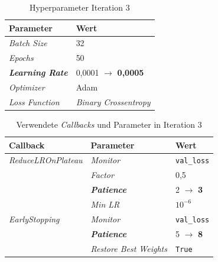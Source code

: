 \documentclass[
    a4paper,        %
    11pt,           %
    ngerman,        %
    parskip=half,   %
    listof=totoc,   %
    bibliography=totoc %
]{scrartcl}
\begin{document}
\begin{table}[H]
    \centering
    \caption{Hyperparameter Iteration 3}
    \label{tab:hyperparams_iter3}
    \begin{tabular}{ll}
        \toprule
        \textbf{Parameter} & \textbf{Wert} \\
        \midrule
        \textit{Batch Size} & 32 \\
        \textit{Epochs} & 50 \\
        \textbf{\textit{Learning Rate}} & 0,0001 $\rightarrow$ \textbf{0,0005} \\
        \textit{Optimizer} & Adam \\
        \textit{Loss Function} & \textit{Binary Crossentropy} \\
        \bottomrule
    \end{tabular}
\end{table}

\begin{table}[H]
    \centering
    \caption{Verwendete \textit{Callbacks} und Parameter in Iteration 3}
    \label{tab:callbacks_iter3}
    \begin{tabular}{lll}
        \toprule
        \textbf{Callback} & \textbf{Parameter} & \textbf{Wert} \\
        \midrule
        \textit{ReduceLROnPlateau} & \textit{Monitor} & \texttt{val\_loss} \\
                          & \textit{Factor} & 0,5 \\
                          & \textbf{\textit{Patience}} & 2 $\rightarrow$ \textbf{3} \\
                          & \textit{Min LR} & $10^{-6}$ \\
        \midrule
        \textit{EarlyStopping}     & \textit{Monitor} & \texttt{val\_loss} \\
                          & \textbf{\textit{Patience}} & 5 $\rightarrow$ \textbf{8} \\
                          & \textit{Restore Best Weights} & \texttt{True} \\
        \bottomrule
    \end{tabular}
\end{table}
\end{document}
